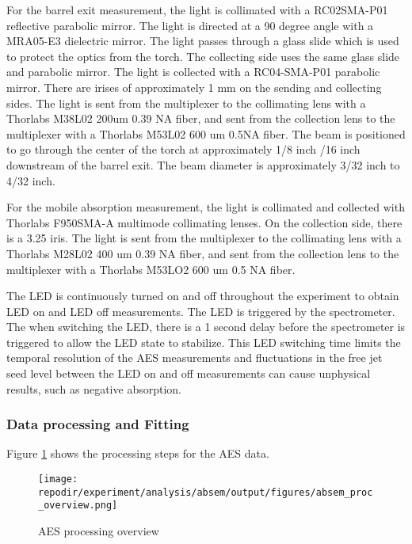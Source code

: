 For the barrel exit measurement, the light is collimated with a RC02SMA-P01 reflective parabolic mirror. The light is directed at a 90 degree angle with a MRA05-E3 dielectric mirror. The light passes through a glass slide which is used to protect the optics from the torch. The collecting side uses the same glass slide and parabolic mirror. The light is collected with a RC04-SMA-P01 parabolic mirror. There are irises of approximately 1 mm on the sending and collecting sides. The light is sent from the multiplexer to the collimating lens with a Thorlabs M38L02 200um 0.39 NA fiber, and sent from the collection lens to the multiplexer with a Thorlabs M53L02 600 um 0.5NA fiber. The beam is positioned to go through the center of the torch at approximately 1/8 inch /16 inch downstream of the barrel exit. The beam diameter is approximately 3/32 inch to 4/32 inch. 

For the mobile absorption measurement, the light is collimated and collected with Thorlabs F950SMA-A multimode collimating lenses.  On the collection side, there is a 3.25  iris. The light is sent from the multiplexer to the collimating lens with a Thorlabs M28L02 400 um 0.39 NA fiber, and sent from the collection lens to the multiplexer with a Thorlabs M53LO2 600 um 0.5 NA fiber. 

The LED is continuously turned on and off throughout the experiment to obtain LED on and LED off measurements. The LED is triggered by the spectrometer. The when switching the LED, there is a 1 second delay before the spectrometer is triggered to allow the LED state to stabilize. This LED switching time limits the temporal resolution of the AES measurements and fluctuations in the free jet seed level between the LED on and off measurements can cause unphysical results, such as negative absorption. 

\subsubsection{Data processing and Fitting}

Figure \ref{fig:SI_AES_proc_overview} shows the processing steps for the AES data.

\begin{figure}[]
    \centering
    \texttt{[image: \\repodir/experiment/analysis/absem/output/figures/absem\_proc\_overview.png]}
    \caption{AES processing overview}
    \label{fig:SI_AES_proc_overview}
\end{figure}




